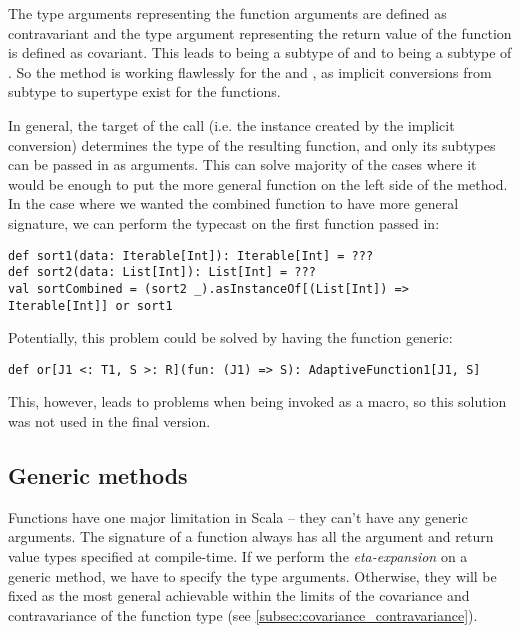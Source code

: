 The type arguments representing the function arguments are defined as contravariant and the type argument representing the return value of the function is defined as covariant. This leads to  being a subtype of  and to  being a subtype of . So the  method is working flawlessly for the  and , as implicit conversions from subtype to supertype exist for the functions.

In general, the target of the  call (i.e. the  instance created by the implicit conversion) determines the type of the resulting function, and only its subtypes can be passed in as arguments. This can solve majority of the cases where it would be enough to put the more general function on the left side of the  method. In the case where we wanted the combined function to have more general signature, we can perform the typecast on the first function passed in:

\lstset{style=Scala}
\begin{lstlisting}
def sort1(data: Iterable[Int]): Iterable[Int] = ???
def sort2(data: List[Int]): List[Int] = ???
val sortCombined = (sort2 _).asInstanceOf[(List[Int]) => Iterable[Int]] or sort1
\end{lstlisting}

Potentially, this problem could be solved by having the  function generic:
\lstset{style=Scala}
\begin{lstlisting}
def or[J1 <: T1, S >: R](fun: (J1) => S): AdaptiveFunction1[J1, S]
\end{lstlisting}
This, however, leads to problems when being invoked as a macro, so this solution was not used in the final version.

\subsection{Generic methods}
\label{subsec:generics}


Functions have one major limitation in Scala -- they can't have any generic arguments. The signature of a function always has all the argument and return value types specified at compile-time. If we perform the \textit{eta-expansion} on a generic method, we have to specify the type arguments. Otherwise, they will be fixed as the most general achievable within the limits of the covariance and contravariance of the function type (see \ref{subsec:covariance_contravariance}).


